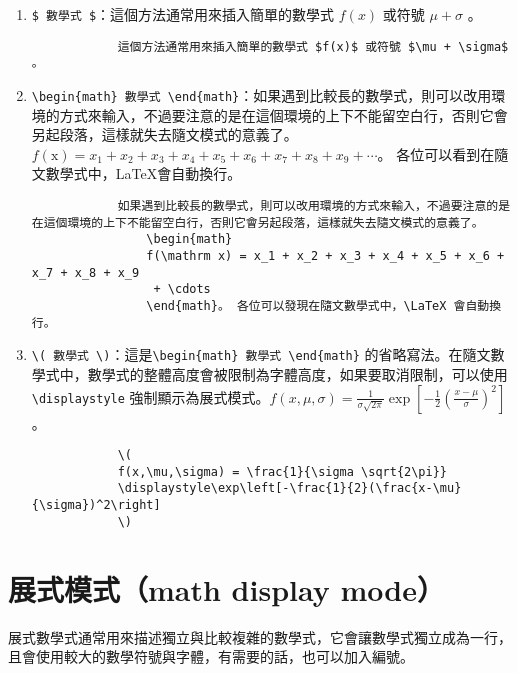 \documentclass[12pt,a4paper]{report}
\begin{document}
\begin{CJK}{UTF8}{bkai}
\begin{enumerate}
	\item \verb|$ 數學式 $|：這個方法通常用來插入簡單的數學式 $f(x)$ 或符號 $\mu + \sigma$ 。
		\begin{framed}
			\begin{verbatim}
			這個方法通常用來插入簡單的數學式 $f(x)$ 或符號 $\mu + \sigma$ 。
			\end{verbatim}
		\end{framed}
	
	\item \verb|\begin{math} 數學式 \end{math}|：如果遇到比較長的數學式，則可以改用環境的方式來輸入，不過要注意的是在這個環境的上下不能留空白行，否則它會另起段落，這樣就失去隨文模式的意義了。
		\begin{math}
		f(\mathrm x) = x_1 + x_2 + x_3 + x_4 + x_5 + x_6 + x_7 + x_8 + x_9 + \cdots
		\end{math}。 各位可以看到在隨文數學式中，\LaTeX 會自動換行。
		\begin{framed}
			\begin{verbatim}
			如果遇到比較長的數學式，則可以改用環境的方式來輸入，不過要注意的是在這個環境的上下不能留空白行，否則它會另起段落，這樣就失去隨文模式的意義了。
				\begin{math}
				f(\mathrm x) = x_1 + x_2 + x_3 + x_4 + x_5 + x_6 + x_7 + x_8 + x_9
				 + \cdots
				\end{math}。 各位可以發現在隨文數學式中，\LaTeX 會自動換行。
			\end{verbatim}
		\end{framed}
	
	\item \verb|\( 數學式 \)|：這是\verb|\begin{math} 數學式 \end{math}| 的省略寫法。在隨文數學式中，數學式的整體高度會被限制為字體高度，如果要取消限制，可以使用 \verb|\displaystyle| 強制顯示為展式模式。\( f(x,\mu,\sigma) = \frac{1}{\sigma \sqrt{2\pi}}\displaystyle\exp\left[-\frac{1}{2}(\frac{x-\mu}{\sigma})^2\right]\)。
		\begin{framed}
			\begin{verbatim}
			\( 
			f(x,\mu,\sigma) = \frac{1}{\sigma \sqrt{2\pi}}
			\displaystyle\exp\left[-\frac{1}{2}(\frac{x-\mu}{\sigma})^2\right]
			\)
			\end{verbatim}
		\end{framed}
\end{enumerate}

\section{展式模式（math display mode）}
展式數學式通常用來描述獨立與比較複雜的數學式，它會讓數學式獨立成為一行，且會使用較大的數學符號與字體，有需要的話，也可以加入編號。


\end{CJK}
\end{document}

